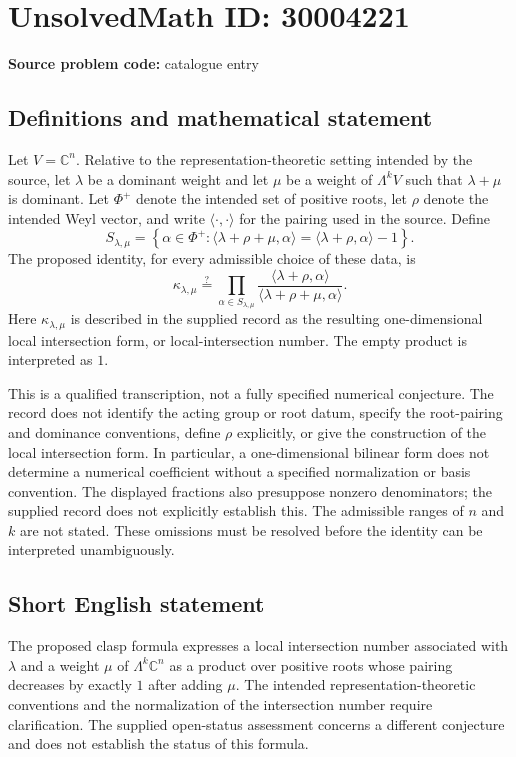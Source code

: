 \documentclass[11pt]{article}
\newcommand{\C}{\mathbb{C}}
\begin{document}
\section*{UnsolvedMath ID: 30004221}
\textbf{Source problem code:} catalogue entry
\subsection{Definitions and mathematical statement}
Let \(V=\C^n\). Relative to the representation-theoretic setting intended by the source, let \(\lambda\) be a dominant weight and let \(\mu\) be a weight of \(\Lambda^k V\) such that \(\lambda+\mu\) is dominant. Let \(\Phi^+\) denote the intended set of positive roots, let \(\rho\) denote the intended Weyl vector, and write \(\langle\cdot,\cdot\rangle\) for the pairing used in the source. Define
\[
S_{\lambda,\mu}=\left\{\alpha\in\Phi^+:
\langle\lambda+\rho+\mu,\alpha\rangle
=\langle\lambda+\rho,\alpha\rangle-1\right\}.
\]
The proposed identity, for every admissible choice of these data, is
\[
\kappa_{\lambda,\mu}
\stackrel{?}{=}
\prod_{\alpha\in S_{\lambda,\mu}}
\frac{\langle\lambda+\rho,\alpha\rangle}
{\langle\lambda+\rho+\mu,\alpha\rangle}.
\]
Here \(\kappa_{\lambda,\mu}\) is described in the supplied record as the resulting one-dimensional local intersection form, or local-intersection number. The empty product is interpreted as \(1\).

This is a qualified transcription, not a fully specified numerical conjecture. The record does not identify the acting group or root datum, specify the root-pairing and dominance conventions, define \(\rho\) explicitly, or give the construction of the local intersection form. In particular, a one-dimensional bilinear form does not determine a numerical coefficient without a specified normalization or basis convention. The displayed fractions also presuppose nonzero denominators; the supplied record does not explicitly establish this. The admissible ranges of \(n\) and \(k\) are not stated. These omissions must be resolved before the identity can be interpreted unambiguously.
\subsection{Short English statement}
The proposed clasp formula expresses a local intersection number associated with \(\lambda\) and a weight \(\mu\) of \(\Lambda^k\C^n\) as a product over positive roots whose pairing decreases by exactly \(1\) after adding \(\mu\). The intended representation-theoretic conventions and the normalization of the intersection number require clarification. The supplied open-status assessment concerns a different conjecture and does not establish the status of this formula.
\end{document}
